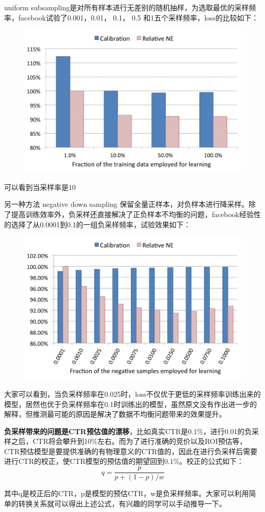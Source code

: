 \documentclass[12pt]{article}
\begin{document}
uniform subsampling是对所有样本进行无差别的随机抽样，为选取最优的采样频率，facebook试验了0.001，0.01， 0.1， 0.5 和1五个采样频率，loss的比较如下：
\begin{figure}[H]
    \centering
    \includegraphics[width=.6\textwidth]{fig/Facebook_DownSample.jpg}
\end{figure}
可以看到当采样率是10%

另一种方法 negative down sampling 保留全量正样本，对负样本进行降采样。除了提高训练效率外，负采样还直接解决了正负样本不均衡的问题，facebook经验性的选择了从0.0001到0.1的一组负采样频率，试验效果如下：
\begin{figure}[H]
    \centering
    \includegraphics[width=.6\textwidth]{fig/Facebook_Negative_Down_Sampling.jpg}
\end{figure}
大家可以看到，当负采样频率在0.025时，loss不仅优于更低的采样频率训练出来的模型，居然也优于负采样频率在0.1时训练出的模型，虽然原文没有作出进一步的解释，但推测最可能的原因是解决了数据不均衡问题带来的效果提升。

\textbf{负采样带来的问题是CTR预估值的漂移}，比如真实CTR是0.1\%，进行0.01的负采样之后，CTR将会攀升到10\%左右。而为了进行准确的竞价以及ROI预估等，CTR预估模型是要提供准确的有物理意义的CTR值的，因此在进行负采样后需要进行CTR的校正，使CTR模型的预估值的期望回到0.1\%。校正的公式如下：
$$
q = \frac{p}{p + (1-p)/w}
$$

其中q是校正后的CTR，p是模型的预估CTR，w是负采样频率。大家可以利用简单的转换关系就可以得出上述公式，有兴趣的同学可以手动推导一下。
\end{document}
